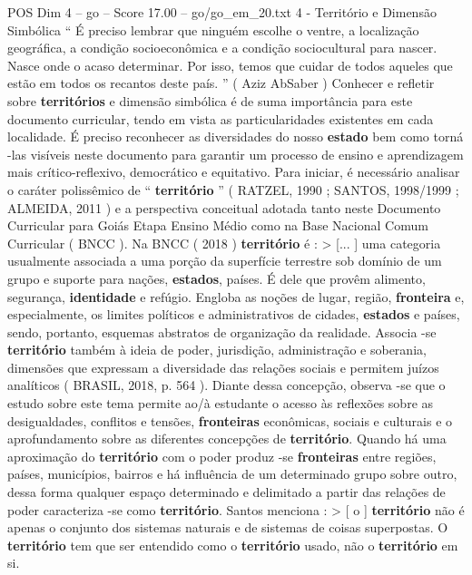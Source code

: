 \begin{textsample}{POS Dim 4 – go – Score 17.00 – go/go\_em\_20.txt}  \label{ex:f4_pos_062}
4 - Território e Dimensão Simbólica “ É preciso lembrar que ninguém escolhe o ventre, a localização geográfica, a condição socioeconômica e a condição sociocultural para nascer.
Nasce onde o acaso determinar.
Por isso, temos que cuidar de todos aqueles que estão em todos os recantos deste país. ” ( Aziz AbSaber ) Conhecer e refletir sobre \textbf{territórios} e dimensão simbólica é de suma importância para este documento curricular, tendo em vista as particularidades existentes em cada localidade.
É preciso reconhecer as diversidades do nosso \textbf{estado} bem como torná -las visíveis neste documento para garantir um processo de ensino e aprendizagem mais crítico-reflexivo, democrático e equitativo.
Para iniciar, é necessário analisar o caráter polissêmico de “ \textbf{território} ” ( RATZEL, 1990 ; SANTOS, 1998/1999 ; ALMEIDA, 2011 ) e a perspectiva conceitual adotada tanto neste Documento Curricular para Goiás Etapa Ensino Médio como na Base Nacional Comum Curricular ( BNCC ).
Na BNCC ( 2018 ) \textbf{território} é : > [... ] uma categoria usualmente associada a uma porção da superfície terrestre sob domínio de um grupo e suporte para nações, \textbf{estados}, países.
É dele que provêm alimento, segurança, \textbf{identidade} e refúgio.
Engloba as noções de lugar, região, \textbf{fronteira} e, especialmente, os limites políticos e administrativos de cidades, \textbf{estados} e países, sendo, portanto, esquemas abstratos de organização da realidade.
Associa -se \textbf{território} também à ideia de poder, jurisdição, administração e soberania, dimensões que expressam a diversidade das relações sociais e permitem juízos analíticos ( BRASIL, 2018, p. 564 ).
Diante dessa concepção, observa -se que o estudo sobre este tema permite ao/à estudante o acesso às reflexões sobre as desigualdades, conflitos e tensões, \textbf{fronteiras} econômicas, sociais e culturais e o aprofundamento sobre as diferentes concepções de \textbf{território}.
Quando há uma aproximação do \textbf{território} com o poder produz -se \textbf{fronteiras} entre regiões, países, municípios, bairros e há influência de um determinado grupo sobre outro, dessa forma qualquer espaço determinado e delimitado a partir das relações de poder caracteriza -se como \textbf{território}.
Santos menciona : > [ o ] \textbf{território} não é apenas o conjunto dos sistemas naturais e de sistemas de coisas superpostas.
O \textbf{território} tem que ser entendido como o \textbf{território} usado, não o \textbf{território} em si.

\end{textsample}
